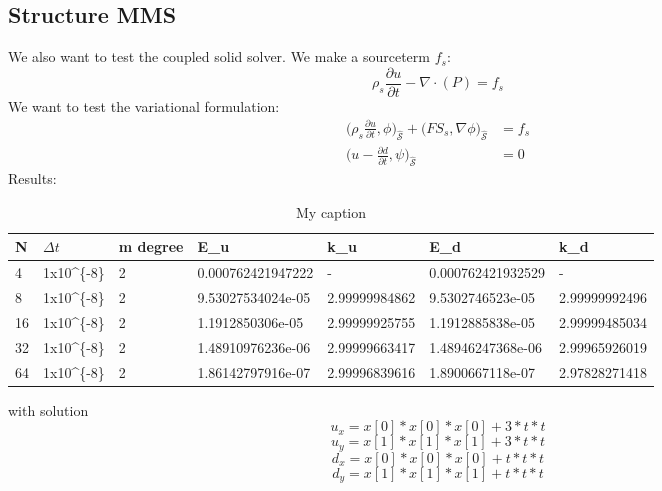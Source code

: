 \subsection{Structure MMS}
We also want to test the coupled solid solver. We make a sourceterm $f_s$:
$$\rho_s \frac{\partial u}{\partial t} - \nabla \cdot ( P ) = f_s $$
We want to test the variational formulation:
\begin{align}
\big(\rho_s \frac{\partial u}{\partial t},\phi \big)_{\mathcal{\hat{S}}} + \big(F S_s, \nabla \phi \big)_{\mathcal{\hat{S}}} &=f_s \\
\big( u- \frac{\partial d}{\partial t} ,\psi \big)_{\mathcal{\hat{S}}} &= 0 
\end{align}
Results:
\begin{table}[h]
\centering
\caption{My caption}
\label{my-label}
\begin{tabular}{|l|l|l|l|l|l|l|}
\hline
N  & $\Delta t$                    & m degree & E\_u              & k\_u          & E\_d              & k\_d          \\ \hline
4  & 1x10\textasciicircum \{-8\} & 2        & 0.000762421947222 & -             & 0.000762421932529 & -             \\ \hline
8  & 1x10\textasciicircum \{-8\} & 2        & 9.53027534024e-05 & 2.99999984862 & 9.5302746523e-05  & 2.99999992496 \\ \hline
16 & 1x10\textasciicircum \{-8\} & 2        & 1.1912850306e-05  & 2.99999925755 & 1.1912885838e-05  & 2.99999485034 \\ \hline
32 & 1x10\textasciicircum \{-8\} & 2        & 1.48910976236e-06 & 2.99999663417 & 1.48946247368e-06 & 2.99965926019 \\ \hline
64 & 1x10\textasciicircum \{-8\} & 2        & 1.86142797916e-07 & 2.99996839616 & 1.8900667118e-07  & 2.97828271418 \\ \hline
\end{tabular}
\end{table}	
with solution 
$$u_x = x[0]*x[0]*x[0]+3*t*t$$
$$u_y = x[1]*x[1]*x[1]+3*t*t$$
$$d_x = x[0]*x[0]*x[0]+t*t*t$$
$$d_y = x[1]*x[1]*x[1]+t*t*t$$













